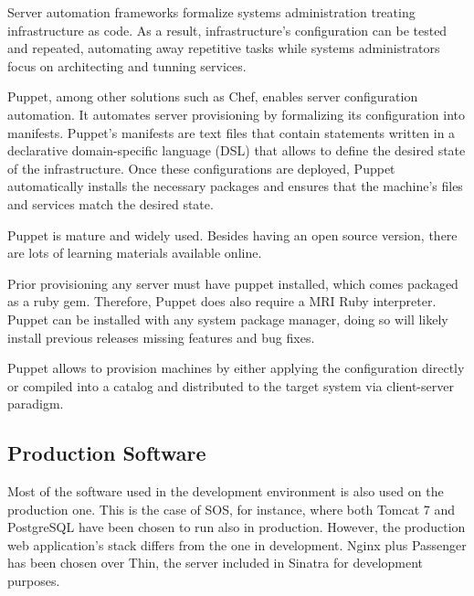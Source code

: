 Server automation frameworks formalize systems administration treating infrastructure as code. As a result, infrastructure's configuration can be tested and repeated, automating away repetitive tasks while systems administrators focus on architecting and tunning services.

Puppet, among other solutions such as Chef, enables server configuration automation. It automates server provisioning by formalizing its configuration into manifests. Puppet's manifests are text files that contain statements written in a declarative domain-specific language (DSL) that allows to define the desired state of the infrastructure. Once these configurations are deployed, Puppet automatically installs the necessary packages and ensures that the machine’s files and services match the desired state.


Puppet is mature and widely used. Besides having an open source version, there are lots of learning materials available online.

Prior provisioning any server must have puppet installed, which comes packaged as a ruby gem. Therefore, Puppet does also require a MRI Ruby interpreter. Puppet can be installed with any system package manager, doing so will likely install previous releases missing features and bug fixes.

Puppet allows to provision machines by either applying the configuration directly or compiled into a catalog and distributed to the target system via client-server paradigm.

\subsection{Production Software}

Most of the software used in the development environment is also used on the production one. This is the case of SOS, for instance, where both Tomcat 7 and PostgreSQL have been chosen to run also in production. However, the production web application's stack differs from the one in development. Nginx plus Passenger has been chosen over Thin, the server included in Sinatra for development purposes.

